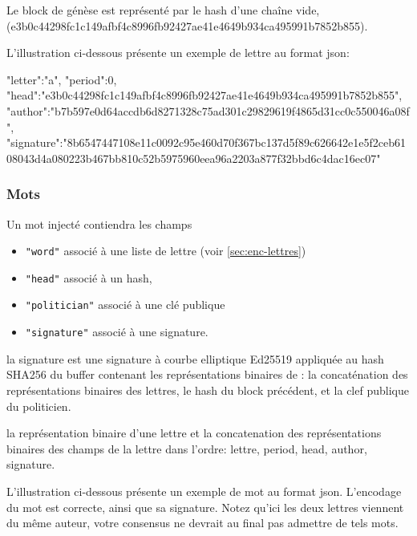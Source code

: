 \documentclass{article}
\begin{document}
 Le block de génèse est représenté par le hash d'une chaîne vide,
 (e3b0c44298fc1c149afbf4c8996fb92427ae41e4649b934ca495991b7852b855).

 L'illustration ci-dessous présente un exemple de
 lettre au format json:

\begin{jsonMessage}
   { "letter":"a", "period":0,
     "head":"e3b0c44298fc1c149afbf4c8996fb92427ae41e4649b934ca495991b7852b855",
     "author":"b7b597e0d64accdb6d8271328c75ad301c29829619f4865d31cc0c550046a08f",
     "signature":"8b6547447108e11c0092c95e460d70f367bc137d5f89c626642e1e5f2ceb6108043d4a080223b467bb810c52b5975960eea96a2203a877f32bbd6c4dac16ec07"
   }
\end{jsonMessage}

 \subsubsection{Mots}
 \label{sec:enc-mots}
 Un mot injecté contiendra les champs
 \begin{itemize}
 \item \texttt{"word"} associé à une liste de lettre (voir
   \ref{sec:enc-lettres})
 \item \texttt{"head"} associé à un hash,
 \item \texttt{"politician"} associé à une clé publique
 \item \texttt{"signature"} associé à une signature.
 \end{itemize}

 la signature est une signature à courbe elliptique Ed25519 appliquée
 au hash SHA256 du buffer contenant les représentations binaires de :
 la concaténation des représentations binaires des lettres, le hash du
 block précédent, et la clef publique du politicien.

 la représentation binaire d'une lettre et la concatenation des
 représentations binaires des champs de la lettre dans l'ordre:
 lettre, period, head, author, signature.

 L'illustration ci-dessous présente un exemple de mot au
 format json. L'encodage du mot est correcte, ainsi que sa
 signature. Notez qu'ici les deux lettres viennent du même auteur,
 votre consensus ne devrait au final pas admettre de tels mots.
\end{document}
